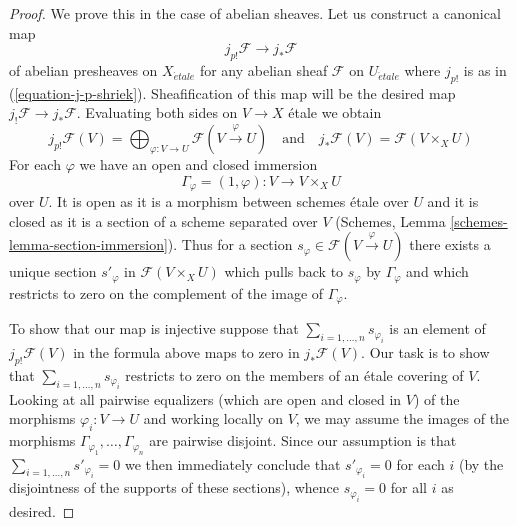 \documentclass[10pt,a4paper]{amsart}
\theoremstyle{plain}
\theoremstyle{definition}
\theoremstyle{remark}
\numberwithin{equation}{subsection}
\def\etale{{\acute{e}tale}}
\begin{document}
\begin{proof}
We prove this in the case of abelian sheaves. Let us construct a canonical map
$$
j_{p!}\mathcal{F} \to j_*\mathcal{F}
$$
of abelian presheaves on $X_\etale$ for any abelian sheaf
$\mathcal{F}$ on $U_\etale$ where $j_{p!}$ is as in
(\ref{equation-j-p-shriek}). Sheafification of this map will
be the desired map $j_!\mathcal{F} \to j_*\mathcal{F}$.
Evaluating both sides on $V \to X$ \'etale we obtain
$$
j_{p!}\mathcal{F}(V) =
\bigoplus\nolimits_{\varphi : V \to U} \mathcal{F}(V \xrightarrow{\varphi} U)
\quad\text{and}\quad
j_*\mathcal{F}(V) = \mathcal{F}(V \times_X U)
$$
For each $\varphi$ we have an open and closed immersion
$$
\Gamma_\varphi = (1, \varphi) : V \longrightarrow V \times_X U
$$
over $U$. It is open as it is a morphism between schemes \'etale
over $U$ and it is closed as it is a section of a scheme separated
over $V$ (Schemes, Lemma \ref{schemes-lemma-section-immersion}).
Thus for a section $s_\varphi \in \mathcal{F}(V \xrightarrow{\varphi} U)$
there exists a unique section $s'_\varphi$ in $\mathcal{F}(V \times_X U)$
which pulls back to $s_\varphi$ by $\Gamma_\varphi$
and which restricts to zero on the complement of the image of $\Gamma_\varphi$.

\medskip\noindent
To show that our map is injective suppose that
$\sum_{i = 1, \ldots, n} s_{\varphi_i}$ is an element of
$j_{p!}\mathcal{F}(V)$ in the formula above maps to zero
in $j_*\mathcal{F}(V)$. Our task is to show that
$\sum_{i = 1, \ldots, n} s_{\varphi_i}$ restricts to zero
on the members of an \'etale covering of $V$.
Looking at all pairwise equalizers
(which are open and closed in $V$) of the morphisms
$\varphi_i : V \to U$ and working locally on $V$, we
may assume the images of the morphisms
$\Gamma_{\varphi_1}, \ldots, \Gamma_{\varphi_n}$
are pairwise disjoint. Since our assumption is that
$\sum_{i = 1, \ldots, n} s'_{\varphi_i} = 0$
we then immediately conclude that $s'_{\varphi_i} = 0$
for each $i$ (by the disjointness of the supports of these
sections), whence $s_{\varphi_i} = 0$ for all $i$ as desired.
\end{proof}
\end{document}
